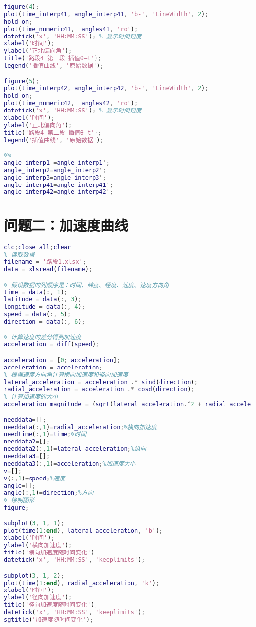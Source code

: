 \documentclass[withoutpreface,bwprint]{cumcmthesis} %
\begin{document}
\begin{appendices}
\begin{lstlisting}[language=matlab]
figure(4);
plot(time_interp41, angle_interp41, 'b-', 'LineWidth', 2);
hold on;
plot(time_numeric41,  angles41, 'ro');
datetick('x', 'HH:MM:SS'); % 显示时间刻度
xlabel('时间');
ylabel('正北偏向角');
title('路段4 第一段 插值θ—t');
legend('插值曲线', '原始数据');

figure(5);
plot(time_interp42, angle_interp42, 'b-', 'LineWidth', 2);
hold on;
plot(time_numeric42,  angles42, 'ro');
datetick('x', 'HH:MM:SS'); % 显示时间刻度
xlabel('时间');
ylabel('正北偏向角');
title('路段4 第二段 插值θ—t');
legend('插值曲线', '原始数据');

%%
angle_interp1 =angle_interp1';
angle_interp2=angle_interp2';
angle_interp3=angle_interp3';
angle_interp41=angle_interp41';
angle_interp42=angle_interp42';


 \end{lstlisting}

\section{问题二：加速度曲线}
\begin{lstlisting}[language=matlab]
clc;close all;clear
% 读取数据
filename = '路段1.xlsx';
data = xlsread(filename);

% 假设数据的列顺序是：时间、纬度、经度、速度、速度方向角
time = data(:, 1);
latitude = data(:, 3);
longitude = data(:, 4);
speed = data(:, 5);
direction = data(:, 6);

% 计算速度的差分得到加速度
acceleration = diff(speed);

acceleration = [0; acceleration];
acceleration = acceleration;
% 根据速度方向角计算横向加速度和径向加速度
lateral_acceleration = acceleration .* sind(direction);
radial_acceleration = acceleration .* cosd(direction);
% 计算加速度的大小
acceleration_magnitude = (sqrt(lateral_acceleration.^2 + radial_acceleration.^2));

needdata=[];
needdata(:,1)=radial_acceleration;%横向加速度
needtime(:,1)=time;%时间
needdata2=[];
needdata2(:,1)=lateral_acceleration;%纵向
needdata3=[];
needdata3(:,1)=acceleration;%加速度大小
v=[];
v(:,1)=speed;%速度
angle=[];
angle(:,1)=direction;%方向
% 绘制图形
figure;

subplot(3, 1, 1);
plot(time(1:end), lateral_acceleration, 'b');
xlabel('时间');
ylabel('横向加速度');
title('横向加速度随时间变化');
datetick('x', 'HH:MM:SS', 'keeplimits');

subplot(3, 1, 2);
plot(time(1:end), radial_acceleration, 'k');
xlabel('时间');
ylabel('径向加速度');
title('径向加速度随时间变化');
datetick('x', 'HH:MM:SS', 'keeplimits');
sgtitle('加速度随时间变化');



\end{lstlisting}
\end{appendices}
\end{document}
